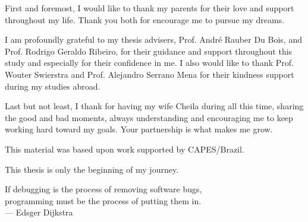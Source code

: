 \documentclass[tese,capa,english]{texufpel}
\begin{document}
\begin{agradecimentos}
  First and foremost, I would like to thank my parents for their love and support throughout my life. Thank you both for encourage me to pursue my dreams.

\vspace{5pt}
  
  I am profoundly grateful to my thesis advisers, Prof. Andr\'{e} Rauber Du Bois, and Prof. Rodrigo Geraldo Ribeiro, for their guidance and support throughout this study and especially for their confidence in me. I also would like to thank Prof. Wouter Swierstra and Prof. Alejandro Serrano Mena for their kindness support during my studies abroad.

\vspace{5pt}
  

  
  Last but not least, I thank for having my wife Cheila during all this time, sharing the good and bad moments, always understanding and encouraging me to keep working hard toward my goals. Your partnership is what makes me grow.

\vspace{5pt}
  
  This material was based upon work supported by CAPES/Brazil. %
  
\vspace{15pt}
  
  This thesis is only the beginning of my journey.

\end{agradecimentos}

\begin{epigrafe}
  If debugging is the process of removing software bugs, \\ programming must be the process of putting them in.\\
  {\sc --- Edsger Dijkstra}
\end{epigrafe}
\end{document}
